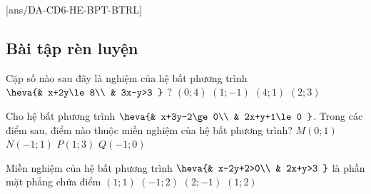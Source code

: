 [ans/DA-CD6-HE-BPT-BTRL]
\subsection{Bài tập rèn luyện}

\begin{ex}%
    Cặp số nào sau đây là nghiệm của hệ bất phương trình  $\heva{& x+2y\le8\\ & 3x-y>3 }$ ?
    \choice
    {$\left(0; 4\right)$ }
    {$\left(1; -1\right)$}
    {\True $\left(4; 1\right)$}
    {$\left(2; 3\right)$}
\end{ex}	

\begin{ex}%
    Cho hệ bất phương trình $\heva{& x+3y-2\ge0\\ & 2x+y+1\le0 }$. Trong các điểm sau, điểm nào thuộc miền nghiệm của hệ bất phương trình?
    \choice
    {$M\left(0;1\right)$}
    {\True $N\left(-1;1\right)$}
    {$P\left(1;3\right)$}
    {$Q\left(-1;0\right)$}
\end{ex}

\begin{ex}%
    Miền nghiệm của hệ bất phương trình $\heva{& x-2y+2>0\\ & 2x+y>3 }$  là phần mặt phẳng chứa điểm
    \choice
    {$\left(1;1\right)$ }
    {$\left(-1;2\right)$}
    {$\left(2;-1\right)$}
    {\True $\left(1;2\right)$}
\end{ex}	

